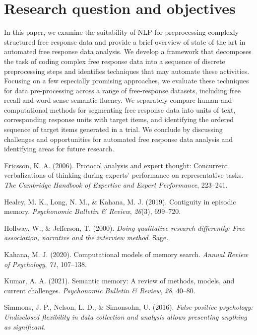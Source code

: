 \documentclass[
  letterpaper,
  DIV=11,
  numbers=noendperiod]{scrreprt}
\newlength{\cslhangindent}
\newlength{\cslentryspacingunit} %
\newenvironment{CSLReferences}[2] %
 {%
  \setlength{\parindent}{0pt}
  \ifodd #1
  \let\oldpar\par
  \def\par{\hangindent=\cslhangindent\oldpar}
  \fi
  \setlength{\parskip}{#2\cslentryspacingunit}
 }%
 {}
\begin{document}
\hypertarget{research-question-and-objectives}{%
\section{Research question and
objectives}\label{research-question-and-objectives}}

In this paper, we examine the suitability of NLP for preprocessing
complexly structured free response data and provide a brief overview of
state of the art in automated free response data analysis. We develop a
framework that decomposes the task of coding complex free response data
into a sequence of discrete preprocessing steps and identifies
techniques that may automate these activities. Focusing on a few
especially promising approaches, we evaluate these techniques for data
pre-processing across a range of free-response datasets, including free
recall and word sense semantic fluency. We separately compare human and
computational methods for segmenting free response data into units of
text, corresponding response units with target items, and identifying
the ordered sequence of target items generated in a trial. We conclude
by discussing challenges and opportunities for automated free response
data analysis and identifying areas for future research.

\hypertarget{refs}{}
\begin{CSLReferences}{1}{0}
\leavevmode{}%
Ericsson, K. A. (2006). Protocol analysis and expert thought: Concurrent
verbalizations of thinking during experts' performance on representative
tasks. \emph{The Cambridge Handbook of Expertise and Expert
Performance}, 223--241.

\leavevmode{}%
Healey, M. K., Long, N. M., \& Kahana, M. J. (2019). Contiguity in
episodic memory. \emph{Psychonomic Bulletin \& Review}, \emph{26}(3),
699--720.

\leavevmode{}%
Hollway, W., \& Jefferson, T. (2000). \emph{Doing qualitative research
differently: Free association, narrative and the interview method}.
Sage.

\leavevmode{}%
Kahana, M. J. (2020). Computational models of memory search.
\emph{Annual Review of Psychology}, \emph{71}, 107--138.

\leavevmode{}%
Kumar, A. A. (2021). Semantic memory: A review of methods, models, and
current challenges. \emph{Psychonomic Bulletin \& Review}, \emph{28},
40--80.

\leavevmode{}%
Simmons, J. P., Nelson, L. D., \& Simonsohn, U. (2016).
\emph{False-positive psychology: Undisclosed flexibility in data
collection and analysis allows presenting anything as significant.}

\end{CSLReferences}
\end{document}
